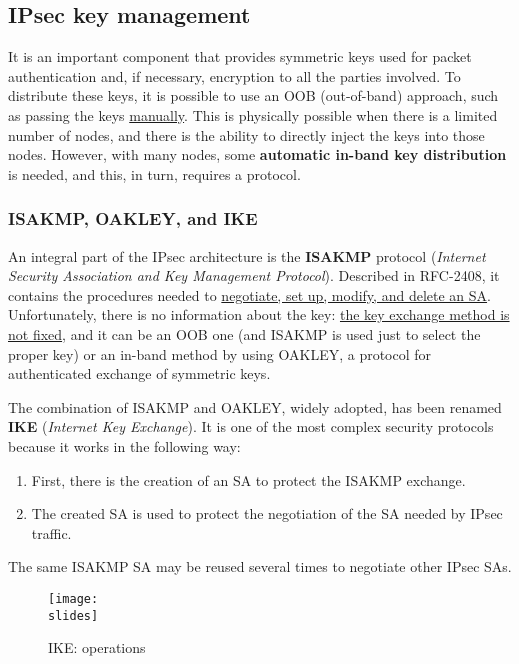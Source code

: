 \subsection{IPsec key management}
It is an important component that provides symmetric keys used for packet authentication and, if necessary, encryption to all the parties involved. To distribute these keys, it is possible to use an OOB (out-of-band) approach, such as passing the keys \underline{manually}. This is physically possible when there is a limited number of nodes, and there is the ability to directly inject the keys into those nodes. However, with many nodes, some \textbf{automatic in-band key distribution} is needed, and this, in turn, requires a protocol.


\subsubsection{ISAKMP, OAKLEY, and IKE}
An integral part of the IPsec architecture is the \textbf{ISAKMP} protocol (\textit{Internet Security Association and Key Management Protocol}). Described in RFC-2408, it contains the procedures needed to \ul{negotiate, set up, modify, and delete an SA}.
Unfortunately, there is no information about the key: \underline{the key exchange method is not fixed}, and it can be an OOB one (and ISAKMP is used just to select the proper key) or an in-band method by using OAKLEY, a protocol for authenticated exchange of symmetric keys.

The combination of ISAKMP and OAKLEY, widely adopted, has been renamed \textbf{IKE} (\textit{Internet Key Exchange}). It is one of the most complex security protocols because it works in the following way:

\begin{enumerate}
    \item First, there is the creation of an SA to protect the ISAKMP exchange.
    \item The created SA is used to protect the negotiation of the SA needed by IPsec traffic.
\end{enumerate}
The same ISAKMP SA may be reused several times to negotiate other IPsec SAs.


\begin{figure}[h]
    \centering
    \texttt{[image: \\slides]}
    \caption{IKE: operations}
    \label{IKE-operations}
\end{figure}

